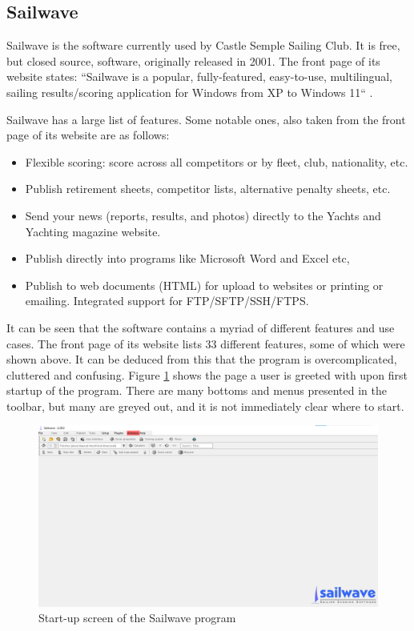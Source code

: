 \documentclass{l4proj}
\begin{document}
\subsection{Sailwave}
Sailwave is the software currently used by Castle Semple Sailing Club. It is free, but closed source, software, originally released in 2001.
The front page of its website states: “Sailwave is a popular, fully-featured, easy-to-use, multilingual, sailing results/scoring application for Windows from XP to Windows 11“ \citep{sailwave}.

Sailwave has a large list of features. Some notable ones, also taken from the front page of its website \citep{sailwave} are as follows:
\begin{itemize}
    \item
    Flexible scoring: score across all competitors or by fleet, club, nationality, etc.
    \item
    Publish retirement sheets, competitor lists, alternative penalty sheets, etc.
    \item
    Send your news (reports, results, and photos) directly to the Yachts and Yachting magazine website.
    \item
    Publish directly into programs like Microsoft Word and Excel etc,
    \item
    Publish to web documents (HTML) for upload to websites or printing or emailing. Integrated support for FTP/SFTP/SSH/FTPS.
\end{itemize}

It can be seen that the software contains a myriad of different features and use cases. The front page of its website lists 33 different features, some of which were shown above. It can be deduced from this that the program is overcomplicated, cluttered and confusing.
Figure \ref{fig:SailwaveEmpty} shows the page a user is greeted with upon first startup of the program. There are many bottoms and menus presented in the toolbar, but many are greyed out, and it is not immediately clear where to start.

\begin{figure}[H]
    \centering
    \includegraphics[width=1\linewidth]{images/SailwaveEmpty.png} 

    \caption{Start-up screen of the Sailwave program \citep{sailwave}
    }

    \label{fig:SailwaveEmpty} 
\end{figure}
\end{document}
